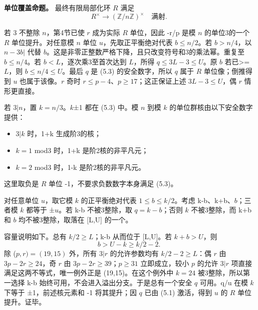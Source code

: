 \documentclass[11pt,a4paper]{article}
\newcommand{\tightlist}{\setlength{\itemsep}{0pt}\setlength{\parskip}{0pt}}
\theoremstyle{definition}
\numberwithin{equation}{section}
\begin{document}
\textbf{{单位覆盖命题。}} {最终有限局部化环} {\ensuremath{R}} {满足} \[
R^\times\longrightarrow(\mathbb Z/n\mathbb Z)^\times
\quad\text{满射}.
\tag{C26.5.5}
\]

{若} {3} {不整除} {\ensuremath{n}，第4节已使} {\ensuremath{r}} {成为实际} {\ensuremath{R}} {单位，因此} {-r/p} {是模} {\ensuremath{n}} {的单位3的一个} {\ensuremath{R}} {单位提升。对任意模} {\ensuremath{n}} {单位} {\ensuremath{u}，先取正平衡绝对代表} {\ensuremath{b\le n/2}。若} {\ensuremath{b>n/4}，以} {\textbar{}\ensuremath{n-3b|}} {代替} {\ensuremath{b}。这是非零正整数严格下降，且只改变符号和3的乘法幂。重复至} {\ensuremath{b\le n/4}。若} {\ensuremath{b<L}，逐次乘3至首次达到} {\ensuremath{L}，所得} {\ensuremath{q\le 3L-3\le U}。原} {\ensuremath{b}} {若已\textgreater=\ensuremath{L}，则} {\ensuremath{b\le n/4\le U}。最后} {\ensuremath{q}} {是} {(5.3)} {的安全数字，所以} {\ensuremath{q}} {属于} {\ensuremath{R}} {单位像；倒推得到} {\ensuremath{u}} {也属于该像。\ensuremath{r}} {奇时} {\ensuremath{r\le p-4}、\ensuremath{p\ge 17}；这正保证上述} {\ensuremath{3L-3\le U}，偶} {\ensuremath{r}} {情形更直接。}

{若} {\ensuremath{3|n}，置} {\ensuremath{k=n/3}。\ensuremath{k}±1} {都在} {(5.3)} {中。模} {\ensuremath{n}} {到模} {\ensuremath{k}} {的单位群核由以下安全数字提供：}

\begin{itemize}
\tightlist
\item
  {\ensuremath{3|k}} {时，1+k} {生成阶3的核；}
\item
  {\ensuremath{k=1}} {mod3} {时，1+k} {是阶2核的非平凡元；}
\item
  {\ensuremath{k=2}} {mod3} {时，1-k} {是阶2核的非平凡元。}
\end{itemize}

{这里取负是} {\ensuremath{R}} {单位} {-1，不要求负数数字本身满足} {(5.3)。}

{对任意单位} {\ensuremath{u}，取它模} {\ensuremath{k}} {的正平衡绝对代表} {\ensuremath{1\le b\le k/2}。考虑} {k-b、k+b、\ensuremath{b}；三者模} {\ensuremath{k}} {都等于} {±\ensuremath{u}。若} {k-b} {不被3整除，取} {\ensuremath{q=k-b}；否则} {\ensuremath{k}} {不被3整除，而} {k+b} {和} {\ensuremath{b}} {均不被3整除，取落在} {{[}L,U{]}} {的一个。}

{容量说明如下。总有} {\ensuremath{k/2\ge L}；k-b} {从而位于} {{[}L,U{]}。若} {\ensuremath{k+b>U}，则} \[
b>U-k\ge k/2-2.
\] {除} {(\ensuremath{p,r)=(19,15)}} {外，所有} {\ensuremath{3|r}} {的允许参数均有} {\ensuremath{k/2-2\ge L}：偶} {\ensuremath{r}} {由} {\ensuremath{3p-2r\ge 24}，奇} {\ensuremath{r}} {由} {\ensuremath{3p-2r\ge 39}；\ensuremath{p\ge 31}} {立即成立，较小} {\ensuremath{p}} {的允许} {\ensuremath{3|r}} {项直接满足这两不等式，唯一例外正是} {(19,15)。在这个例外中} {\ensuremath{k=24}} {被3整除，所以第一选择} {k-b} {始终可用，不会进入溢出分支。于是总有一个安全} {\ensuremath{q}} {可用。q/u} {在模} {\ensuremath{k}} {下等于} {±1，前述核元素和} {-1} {将其提升；因} {\ensuremath{q}} {已由} {(5.1)} {激活，得到} {\ensuremath{u}} {的} {\ensuremath{R}} {单位提升。证毕。}
\end{document}
